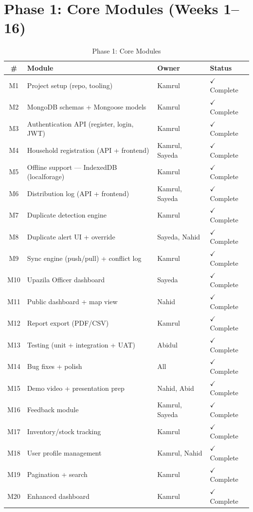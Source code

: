 
\section{Phase 1: Core Modules (Weeks 1--16)}
\begin{table}[H]
\centering
\caption{Phase 1: Core Modules}
\label{tab:phase1}
\begin{tabularx}{\textwidth}{@{}cllX@{}}
\toprule
\# & Module & Owner & Status \\
\midrule
M1 & Project setup (repo, tooling) & Kamrul & $\checkmark$ Complete \\
M2 & MongoDB schemas + Mongoose models & Kamrul & $\checkmark$ Complete \\
M3 & Authentication API (register, login, JWT) & Kamrul & $\checkmark$ Complete \\
M4 & Household registration (API + frontend) & Kamrul, Sayeda & $\checkmark$ Complete \\
M5 & Offline support --- IndexedDB (localforage) & Kamrul & $\checkmark$ Complete \\
M6 & Distribution log (API + frontend) & Kamrul, Sayeda & $\checkmark$ Complete \\
M7 & Duplicate detection engine & Kamrul & $\checkmark$ Complete \\
M8 & Duplicate alert UI + override & Sayeda, Nahid & $\checkmark$ Complete \\
M9 & Sync engine (push/pull) + conflict log & Kamrul & $\checkmark$ Complete \\
M10 & Upazila Officer dashboard & Sayeda & $\checkmark$ Complete \\
M11 & Public dashboard + map view & Nahid & $\checkmark$ Complete \\
M12 & Report export (PDF/CSV) & Kamrul & $\checkmark$ Complete \\
M13 & Testing (unit + integration + UAT) & Abidul & $\checkmark$ Complete \\
M14 & Bug fixes + polish & All & $\checkmark$ Complete \\
M15 & Demo video + presentation prep & Nahid, Abid & $\checkmark$ Complete \\
M16 & Feedback module & Kamrul, Sayeda & $\checkmark$ Complete \\
M17 & Inventory/stock tracking & Kamrul & $\checkmark$ Complete \\
M18 & User profile management & Kamrul, Nahid & $\checkmark$ Complete \\
M19 & Pagination + search & Kamrul & $\checkmark$ Complete \\
M20 & Enhanced dashboard & Kamrul & $\checkmark$ Complete \\
\bottomrule
\end{tabularx}
\end{table}

